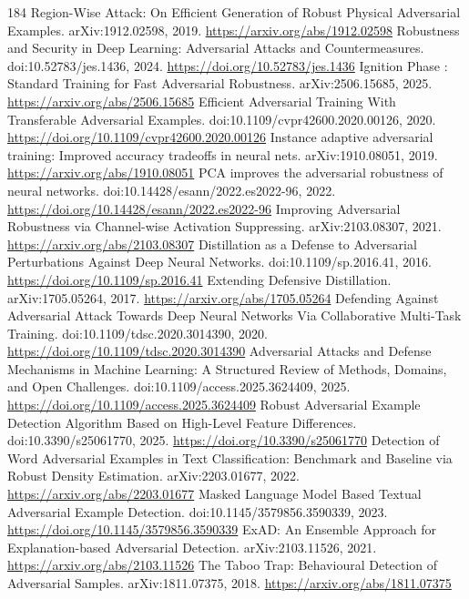 \documentclass[11pt]{article}
\begin{document}
\begin{thebibliography}{184}
 Region-Wise Attack: On Efficient Generation of Robust Physical Adversarial Examples. arXiv:1912.02598, 2019. \url{https://arxiv.org/abs/1912.02598}
 Robustness and Security in Deep Learning: Adversarial Attacks and Countermeasures. doi:10.52783/jes.1436, 2024. \url{https://doi.org/10.52783/jes.1436}
 Ignition Phase : Standard Training for Fast Adversarial Robustness. arXiv:2506.15685, 2025. \url{https://arxiv.org/abs/2506.15685}
 Efficient Adversarial Training With Transferable Adversarial Examples. doi:10.1109/cvpr42600.2020.00126, 2020. \url{https://doi.org/10.1109/cvpr42600.2020.00126}
 Instance adaptive adversarial training: Improved accuracy tradeoffs in neural nets. arXiv:1910.08051, 2019. \url{https://arxiv.org/abs/1910.08051}
 PCA improves the adversarial robustness of neural networks. doi:10.14428/esann/2022.es2022-96, 2022. \url{https://doi.org/10.14428/esann/2022.es2022-96}
 Improving Adversarial Robustness via Channel-wise Activation Suppressing. arXiv:2103.08307, 2021. \url{https://arxiv.org/abs/2103.08307}
 Distillation as a Defense to Adversarial Perturbations Against Deep Neural Networks. doi:10.1109/sp.2016.41, 2016. \url{https://doi.org/10.1109/sp.2016.41}
 Extending Defensive Distillation. arXiv:1705.05264, 2017. \url{https://arxiv.org/abs/1705.05264}
 Defending Against Adversarial Attack Towards Deep Neural Networks Via Collaborative Multi-Task Training. doi:10.1109/tdsc.2020.3014390, 2020. \url{https://doi.org/10.1109/tdsc.2020.3014390}
 Adversarial Attacks and Defense Mechanisms in Machine Learning: A Structured Review of Methods, Domains, and Open Challenges. doi:10.1109/access.2025.3624409, 2025. \url{https://doi.org/10.1109/access.2025.3624409}
 Robust Adversarial Example Detection Algorithm Based on High-Level Feature Differences. doi:10.3390/s25061770, 2025. \url{https://doi.org/10.3390/s25061770}
 Detection of Word Adversarial Examples in Text Classification: Benchmark and Baseline via Robust Density Estimation. arXiv:2203.01677, 2022. \url{https://arxiv.org/abs/2203.01677}
 Masked Language Model Based Textual Adversarial Example Detection. doi:10.1145/3579856.3590339, 2023. \url{https://doi.org/10.1145/3579856.3590339}
 ExAD: An Ensemble Approach for Explanation-based Adversarial Detection. arXiv:2103.11526, 2021. \url{https://arxiv.org/abs/2103.11526}
 The Taboo Trap: Behavioural Detection of Adversarial Samples. arXiv:1811.07375, 2018. \url{https://arxiv.org/abs/1811.07375}

\end{thebibliography}
\end{document}
